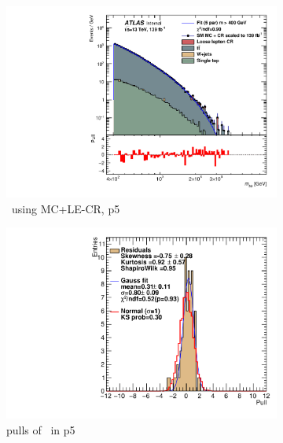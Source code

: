 \begin{figure}[H]
\begin{subfigure}[h]{0.38\linewidth}
    \includegraphics[scale=0.3]{figs/ch6/fit/variable_nosmooth/p5/10PB/output_SMMCplusCR_Mbb_p5.pdf}%
     \caption{\mbb \ using MC+LE-CR, p5}
     \end{subfigure}
     \hfill
    \begin{subfigure}[h]{0.4\linewidth}
    \includegraphics[scale=0.32]{figs/ch6/fit/variable_nosmooth/p5/10PB/pull_SMMCplusCR_Mbb_p5.pdf}%
    \caption{pulls of \mbb \ in p5}
    \end{subfigure}
    \hfill
    \begin{subfigure}[h]{0.38\linewidth}

\end{subfigure}
\end{figure}
